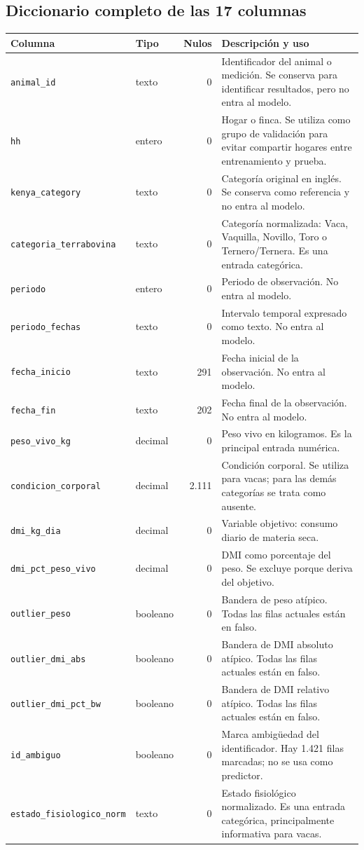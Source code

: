 \documentclass[11pt,a4paper]{article}
\newcommand{\codigo}[1]{\nolinkurl{#1}}
\begin{document}
\subsection{Diccionario completo de las 17 columnas}

\small
\begin{longtable}{p{3.7cm}p{1.5cm}r p{7.8cm}}
\toprule
\textbf{Columna} & \textbf{Tipo} & \textbf{Nulos} & \textbf{Descripción y uso}\\
\midrule
\endhead
\codigo{animal_id} & texto & 0 & Identificador del animal o medición. Se conserva para identificar resultados, pero no entra al modelo.\\
\codigo{hh} & entero & 0 & Hogar o finca. Se utiliza como grupo de validación para evitar compartir hogares entre entrenamiento y prueba.\\
\codigo{kenya_category} & texto & 0 & Categoría original en inglés. Se conserva como referencia y no entra al modelo.\\
\codigo{categoria_terrabovina} & texto & 0 & Categoría normalizada: Vaca, Vaquilla, Novillo, Toro o Ternero/Ternera. Es una entrada categórica.\\
\codigo{periodo} & entero & 0 & Periodo de observación. No entra al modelo.\\
\codigo{periodo_fechas} & texto & 0 & Intervalo temporal expresado como texto. No entra al modelo.\\
\codigo{fecha_inicio} & texto & 291 & Fecha inicial de la observación. No entra al modelo.\\
\codigo{fecha_fin} & texto & 202 & Fecha final de la observación. No entra al modelo.\\
\codigo{peso_vivo_kg} & decimal & 0 & Peso vivo en kilogramos. Es la principal entrada numérica.\\
\codigo{condicion_corporal} & decimal & 2.111 & Condición corporal. Se utiliza para vacas; para las demás categorías se trata como ausente.\\
\codigo{dmi_kg_dia} & decimal & 0 & Variable objetivo: consumo diario de materia seca.\\
\codigo{dmi_pct_peso_vivo} & decimal & 0 & DMI como porcentaje del peso. Se excluye porque deriva del objetivo.\\
\codigo{outlier_peso} & booleano & 0 & Bandera de peso atípico. Todas las filas actuales están en falso.\\
\codigo{outlier_dmi_abs} & booleano & 0 & Bandera de DMI absoluto atípico. Todas las filas actuales están en falso.\\
\codigo{outlier_dmi_pct_bw} & booleano & 0 & Bandera de DMI relativo atípico. Todas las filas actuales están en falso.\\
\codigo{id_ambiguo} & booleano & 0 & Marca ambigüedad del identificador. Hay 1.421 filas marcadas; no se usa como predictor.\\
\codigo{estado_fisiologico_norm} & texto & 0 & Estado fisiológico normalizado. Es una entrada categórica, principalmente informativa para vacas.\\
\bottomrule
\end{longtable}
\normalsize
\end{document}
